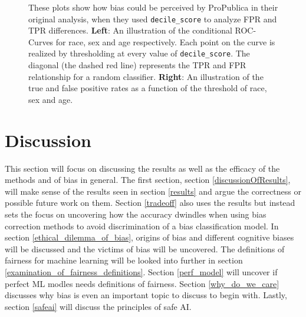 \documentclass[11pt, fleqn, titlepage]{article}
\begin{document}
\begin{figure}[H]
\begin{subfigure}{0.5\textwidth}
		\end{subfigure}
		\caption{These plots show how bias could be perceived by ProPublica in their original analysis, when they used \texttt{decile\_score} to analyze FPR and TPR differences. \textbf{Left}: An illustration of the conditional ROC-Curves for race, sex and age respectively. Each point on the curve is realized by thresholding at every value of \texttt{decile\_score}. The diagonal (the dashed red line) represents the TPR and FPR relationship for a random classifier. \textbf{Right}: An illustration of the true and false positive rates as a function of the threshold of race, sex and age.}
		\label{fig:roc-curve}
	\end{figure}
	
	\section{Discussion} \label{discussion}	
	This section will focus on discussing the results as well as the efficacy of the methods and of bias in general. The first section, section \ref{discussionOfResults}, will make sense of the results seen in section \ref{results} and argue the correctness or possible future work on them. Section \ref{tradeoff} also uses the results but instead sets the focus on uncovering how the accuracy dwindles when using bias correction methods to avoid discrimination of a bias classification model. In section \ref{ethical_dilemma_of_bias}, origins of bias and different cognitive biases will be discussed and the victims of bias will be uncovered. The definitions of fairness for machine learning will be looked into further in section \ref{examination_of_fairness_definitions}. Section \ref{perf_model} will uncover if perfect ML modles needs definitions of fairness. Section \ref{why_do_we_care} discusses why bias is even an important topic to discuss to begin with. Lastly, section \ref{safeai} will discuss the principles of safe AI.
	
\end{document}
